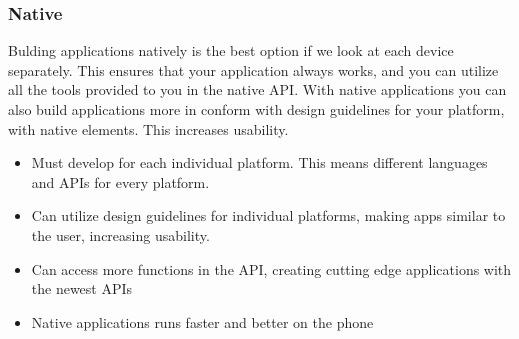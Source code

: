 \subsubsection{Native}
	Bulding applications natively is the best option if we look at each device
	separately. This ensures that your application always works, and you can
	utilize all the tools provided to you in the native API. With native
	applications you can also build applications more in conform with design
	guidelines for your platform, with native elements. This increases
	usability.

	\cite{phonegap:about}

	\begin{itemize}
		\item Must develop for each individual platform. This means different
		languages and APIs for every platform.
		\item Can utilize design guidelines for individual platforms, making
		apps similar to the user, increasing usability.
		\item Can access more functions in the API, creating cutting edge
		applications with the newest APIs
		\item Native applications runs faster and better on the phone
	\end{itemize}
